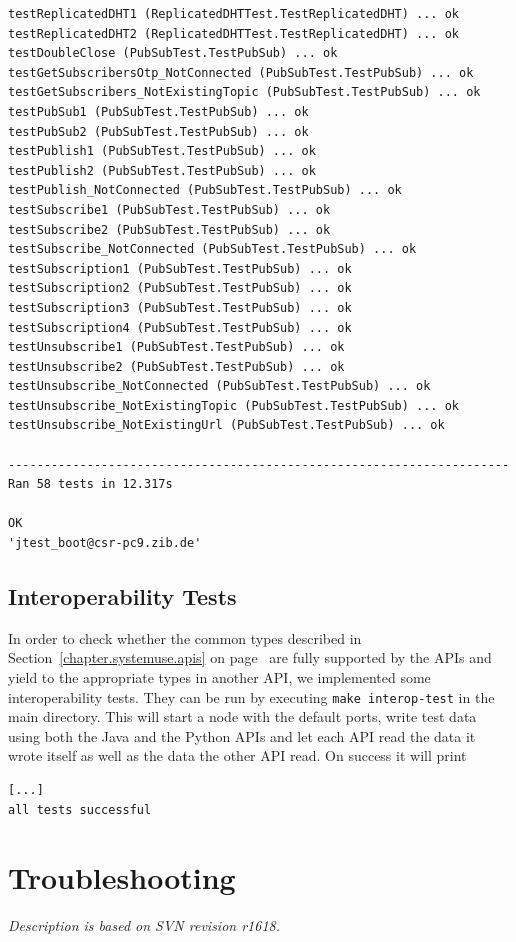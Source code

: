 \documentclass[a4paper]{scrreprt}
\newcommand{\sieheref}[1]{\ref{#1} on page~\pageref{#1}}
\newcommand{\code}[1]{\lstinline[basicstyle=\ttfamily]!#1!}
\newcommand{\svnrev}[1]
{\hfill\emph{Description is based on SVN revision #1.}\medskip}
\begin{document}
\begin{lstlisting}[language={}]
testReplicatedDHT1 (ReplicatedDHTTest.TestReplicatedDHT) ... ok
testReplicatedDHT2 (ReplicatedDHTTest.TestReplicatedDHT) ... ok
testDoubleClose (PubSubTest.TestPubSub) ... ok
testGetSubscribersOtp_NotConnected (PubSubTest.TestPubSub) ... ok
testGetSubscribers_NotExistingTopic (PubSubTest.TestPubSub) ... ok
testPubSub1 (PubSubTest.TestPubSub) ... ok
testPubSub2 (PubSubTest.TestPubSub) ... ok
testPublish1 (PubSubTest.TestPubSub) ... ok
testPublish2 (PubSubTest.TestPubSub) ... ok
testPublish_NotConnected (PubSubTest.TestPubSub) ... ok
testSubscribe1 (PubSubTest.TestPubSub) ... ok
testSubscribe2 (PubSubTest.TestPubSub) ... ok
testSubscribe_NotConnected (PubSubTest.TestPubSub) ... ok
testSubscription1 (PubSubTest.TestPubSub) ... ok
testSubscription2 (PubSubTest.TestPubSub) ... ok
testSubscription3 (PubSubTest.TestPubSub) ... ok
testSubscription4 (PubSubTest.TestPubSub) ... ok
testUnsubscribe1 (PubSubTest.TestPubSub) ... ok
testUnsubscribe2 (PubSubTest.TestPubSub) ... ok
testUnsubscribe_NotConnected (PubSubTest.TestPubSub) ... ok
testUnsubscribe_NotExistingTopic (PubSubTest.TestPubSub) ... ok
testUnsubscribe_NotExistingUrl (PubSubTest.TestPubSub) ... ok

----------------------------------------------------------------------
Ran 58 tests in 12.317s

OK
'jtest_boot@csr-pc9.zib.de'
\end{lstlisting}

\section{Interoperability Tests}
In order to check whether the common types described in
Section~\sieheref{chapter.systemuse.apis} are fully supported by the APIs
and yield to the appropriate types in another API, we implemented some
interoperability tests. They can be run by executing \code{make interop-test}
in the main directory.
This will start a \scalaris{} node with the default ports, write test data using
both the Java and the Python APIs and let each API read the data it wrote
itself as well as the data the other API read. On success it will print

\begin{lstlisting}[language={}]
%> make interop-test
[...]
all tests successful
\end{lstlisting}

\chapter{Troubleshooting}
\svnrev{r1618}
\end{document}
